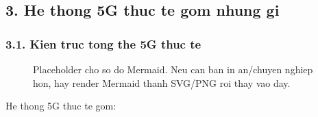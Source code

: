 \documentclass[
  vietnamese,
  a4paper,
  11pt]{article}
\begin{document}
\subsection{3. He thong 5G thuc te gom nhung
gi}\label{he-thong-5g-thuc-te-gom-nhung-gi}

\subsubsection{3.1. Kien truc tong the 5G thuc
te}\label{kien-truc-tong-the-5g-thuc-te}

\begin{figure}[H]
\centering
{}
\caption{Placeholder cho so do Mermaid. Neu can ban in an/chuyen nghiep hon, hay render Mermaid thanh SVG/PNG roi thay vao day.}
\end{figure}

He thong 5G thuc te gom:
\end{document}
